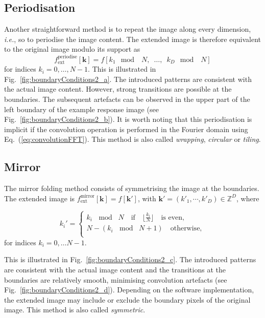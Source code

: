 \documentclass[fleqn,a4paper,oneside,openany]{book}
\begin{document}
\subsection{Periodisation}
%
Another straightforward method is to repeat the image along every dimension, \emph{i.e.}, so to periodise the image content.
The extended image is therefore equivalent to the original image modulo its support as
$$f_{\text{ext}}^{\text{periodise}}[\boldsymbol{k}]=f[k_1\mod\,\,\, N,\,\,\, \dots,\,\,\, k_D\mod\,\,\, N]$$
for indices $k_i = 0,\dots, N-1$.
This is illustrated in Fig.~\ref{fig:boundaryConditions2_a}.
The introduced patterns are consistent with the actual image content. 
However, strong transitions are possible at the boundaries.
The subsequent artefacts can be observed in the upper part of the left boundary of the example response image (see Fig.~\ref{fig:boundaryConditions2_b}).
It is worth noting that this periodisation is implicit if the convolution operation is performed in the Fourier domain using Eq.~(\ref{eq:convolutionFFT}).
This method is also called \textit{wrapping}, \textit{circular} or \textit{tiling}.
%
\subsection{Mirror}
The mirror folding method consists of symmetrising the image at the boundaries. The extended image is
$f_{\text{ext}}^{\text{mirror}}[\boldsymbol{k}]=f[\boldsymbol{k'}]$, with $\boldsymbol{k'} = (k'_1,\cdots,k'_D) \in \mathbb{Z}^D$, where

$$
k_i'=
\begin{cases}
  k_i \,\mod\,\, N \quad\text{if}\quad \lfloor \frac{k_i}{N}\rfloor\quad\text{is even},\\
  N - (k_i \,\mod\,\, N+1) \quad \text{otherwise},\\
 \end{cases}$$
for indices $k_i = 0,\dots N-1$.

This is illustrated in Fig.~\ref{fig:boundaryConditions2_c}.
The introduced patterns are consistent with the actual image content and the transitions at the boundaries are relatively smooth, minimising convolution artefacts (see Fig.~\ref{fig:boundaryConditions2_d}).
Depending on the software implementation, the extended image may include or exclude the boundary pixels of the original image.
This method is also called \textit{symmetric}.
\end{document}
